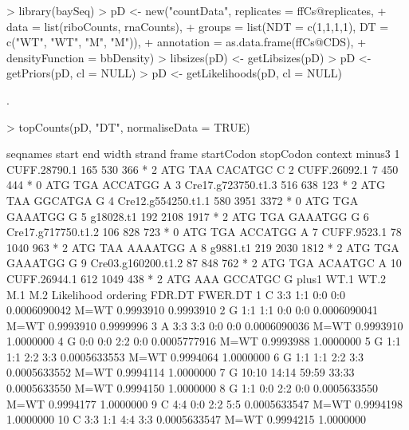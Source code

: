 \documentclass[a4paper]{article}
\begin{document}
\begin{Schunk}
\begin{Sinput}
> library(baySeq)
> pD <- new("countData", replicates = ffCs@replicates, 
+           data = list(riboCounts, rnaCounts),
+           groups = list(NDT = c(1,1,1,1), DT = c("WT", "WT", "M", "M")),
+           annotation = as.data.frame(ffCs@CDS),
+           densityFunction = bbDensity)
> libsizes(pD) <- getLibsizes(pD)
> pD <- getPriors(pD, cl = NULL)
> pD <- getLikelihoods(pD, cl = NULL)
\end{Sinput}
\begin{Soutput}
.
\end{Soutput}
\begin{Sinput}
> topCounts(pD, "DT", normaliseData = TRUE)
\end{Sinput}
\begin{Soutput}
             seqnames start  end width strand frame startCodon stopCodon context minus3
1        CUFF.28790.1   165  530   366      *     2        ATG       TAA CACATGC      C
2        CUFF.26092.1     7  450   444      *     0        ATG       TGA ACCATGG      A
3  Cre17.g723750.t1.3   516  638   123      *     2        ATG       TAA GGCATGA      G
4  Cre12.g554250.t1.1   580 3951  3372      *     0        ATG       TGA GAAATGG      G
5           g18028.t1   192 2108  1917      *     2        ATG       TGA GAAATGG      G
6  Cre17.g717750.t1.2   106  828   723      *     0        ATG       TGA ACCATGG      A
7         CUFF.9523.1    78 1040   963      *     2        ATG       TAA AAAATGG      A
8            g9881.t1   219 2030  1812      *     2        ATG       TGA GAAATGG      G
9  Cre03.g160200.t1.2    87  848   762      *     2        ATG       TGA ACAATGC      A
10       CUFF.26944.1   612 1049   438      *     2        ATG       AAA GCCATGC      G
   plus1  WT.1  WT.2   M.1   M.2   Likelihood ordering    FDR.DT   FWER.DT
1      C   3:3   1:1   0:0   0:0 0.0006090042     M=WT 0.9993910 0.9993910
2      G   1:1   1:1   0:0   0:0 0.0006090041     M=WT 0.9993910 0.9999996
3      A   3:3   3:3   0:0   0:0 0.0006090036     M=WT 0.9993910 1.0000000
4      G   0:0   0:0   2:2   0:0 0.0005777916     M=WT 0.9993988 1.0000000
5      G   1:1   1:1   2:2   3:3 0.0005633553     M=WT 0.9994064 1.0000000
6      G   1:1   1:1   2:2   3:3 0.0005633552     M=WT 0.9994114 1.0000000
7      G 10:10 14:14 59:59 33:33 0.0005633550     M=WT 0.9994150 1.0000000
8      G   1:1   0:0   2:2   0:0 0.0005633550     M=WT 0.9994177 1.0000000
9      C   4:4   0:0   2:2   5:5 0.0005633547     M=WT 0.9994198 1.0000000
10     C   3:3   1:1   4:4   3:3 0.0005633547     M=WT 0.9994215 1.0000000
\end{Soutput}
\end{Schunk}
\end{document}
